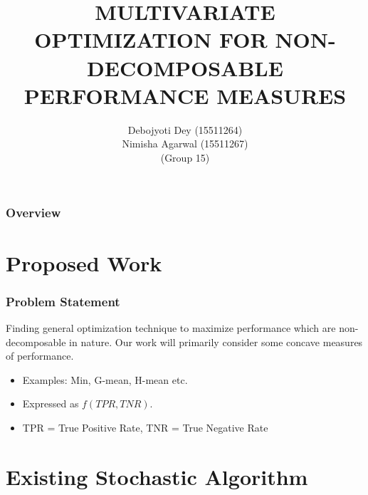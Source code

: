 \documentclass{beamer}
\title[Short title]{MULTIVARIATE OPTIMIZATION FOR NON-DECOMPOSABLE PERFORMANCE MEASURES} %
\author{Debojyoti Dey (15511264)\\ Nimisha Agarwal (15511267)\\ (Group 15)} %
\begin{document}
	
	\begin{frame}
		\titlepage %
	\end{frame}
	
	\begin{frame}
		\frametitle{Overview} %
		\tableofcontents %
	\end{frame}


\section{Proposed Work} %

\begin{frame}
	\frametitle{Problem Statement}
	Finding general optimization technique to maximize performance which are non-decomposable in nature. Our work will primarily consider some concave measures of performance.

\begin{itemize}
\item Examples: Min, G-mean, H-mean etc.
\item Expressed as $f(TPR,TNR)$.
\item TPR = True Positive Rate, TNR = True Negative Rate
\end{itemize}

\end{frame}

\section{Existing Stochastic Algorithm} %
\end{document}
